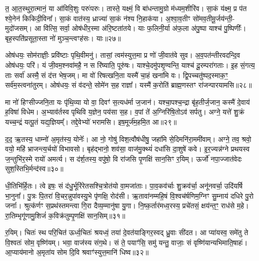 त॒ आ॒त॒स्थुरा॒त्मानं॒ या आ॑विवि॒शुः परुः॑परुः। तास्ते॒ यक्ष्मं॒ वि बा॑धन्तामु॒ग्रो म॑ध्यम॒शीरि॑व। सा॒कं य॑क्ष्म॒ प्र प॑त श्ये॒नेन॑ किकिदी॒विना᳚। सा॒कं वात॑स्य॒ ध्राज्या॑ सा॒कं न॑श्य नि॒हाक॑या। अ॒श्वा॒व॒तीꣳ सो॑मव॒तीमू॒र्जय॑न्ती॒- मुदो॑जसम्। आ वि॑त्सि॒ सर्वा॒ ओष॑धीर॒स्मा अ॑रि॒ष्टता॑तये। याः फ॒लिनी॒र्या अ॑फ॒ला अ॑पु॒ष्पा याश्च॑ पु॒ष्पिणीः᳚। बृह॒स्पति॑प्रसूता॒स्ता नो॑ मुञ्च॒न्त्वꣳह॑सः। याः॥२७॥

ओष॑धयः॒ सोम॑राज्ञीः॒ प्रवि॑ष्टाः पृथि॒वीमनु॑। तासां॒ त्वम॑स्युत्त॒मा प्र णो॑ जी॒वात॑वे सुव। अ॒व॒पत॑न्तीरवदन्दि॒व ओष॑धयः॒ परि॑। यं जी॒वम॒श्नवा॑महै॒ न स रि॑ष्याति॒ पूरु॑षः। याश्चे॒दमु॑पशृ॒ण्वन्ति॒ याश्च॑ दू॒रम्परा॑गताः। इ॒ह सं॒गत्य॒ ताः सर्वा॑ अस्मै॒ सं द॑त्त भेष॒जम्। मा वो॑ रिषत्खनि॒ता यस्मै॑ चा॒हं खना॑मि वः। द्वि॒पच्चतु॑ष्पद॒स्माक॒ꣳ॒ सर्व॑म॒स्त्वना॑तुरम्। ओष॑धयः॒ सं व॑दन्ते॒ सोमे॑न स॒ह राज्ञा᳚। यस्मै॑ क॒रोति॑ ब्राह्म॒णस्तꣳ रा॑जन्पारयामसि॥२८॥

{\anuvakamend[{रपः॑ पत॒त्रिणी॒र्या अꣳह॑सो॒ याः खना॑मि वो॒\-ऽष्टाद॑श च॥६॥}]}

मा नो॑ हिꣳसीज्जनि॒ता यः पृ॑थि॒व्या यो वा॒ दिवꣳ॑ स॒त्यध॑र्मा ज॒जान॑। यश्चा॒पश्च॒न्द्रा बृ॑ह॒तीर्ज॒जान॒ कस्मै॑ दे॒वाय॑ ह॒विषा॑ विधेम। अ॒भ्याव॑र्तस्व पृथिवि य॒ज्ञेन॒ पय॑सा स॒ह। व॒पां ते॑ अ॒ग्निरि॑षि॒तो\-ऽव॑ सर्पतु। अग्ने॒ यत्ते॑ शु॒क्रं यच्च॒न्द्रं यत्पू॒तं यद्य॒ज्ञियम्᳚। तद्दे॒वेभ्यो॑ भरामसि। इष॒मूर्ज॑म॒हमि॒त आ॥२९॥

द॒द॒ ऋ॒तस्य॒ धाम्नो॑ अ॒मृत॑स्य॒ योनेः᳚। आ नो॒ गोषु॑ विश॒त्वौष॑धीषु॒ जहा॑मि से॒दिमनि॑रा॒ममी॑वाम्। अग्ने॒ तव॒ श्रवो॒ वयो॒ महि॑ भ्राजन्त्य॒र्चयो॑ विभावसो। बृह॑द्भानो॒ शव॑सा॒ वाज॑मु॒क्थ्यं॑ दधा॑सि दा॒शुषे॑ कवे। इ॒र॒ज्यन्न॑ग्ने प्रथयस्व ज॒न्तुभि॑र॒स्मे रायो॑ अमर्त्य। स द॑र्\mbox{}श॒तस्य॒ वपु॑षो॒ वि रा॑जसि पृ॒णक्षि॑ सान॒सिꣳ र॒यिम्। ऊर्जो॑ नपा॒ज्जात॑वेदः सुश॒स्तिभि॒र्मन्द॑स्व॥३०॥

धी॒तिभि॑र्हि॒तः। त्वे इषः॒ सं द॑धु॒र्भूरि॑रेतसश्चि॒त्रोत॑यो वा॒मजा॑ताः। पा॒व॒कव॑र्चाः शु॒क्रव॑र्चा॒ अनू॑नवर्चा॒ उदि॑यर्\mbox{}षि भा॒नुना᳚। पु॒त्रः पि॒तरा॑ वि॒चर॒न्नुपा॑वस्यु॒भे पृ॑णक्षि॒ रोद॑सी। ऋ॒तावा॑नम्महि॒षं वि॒श्वच॑र्\mbox{}षणिम॒ग्निꣳ सु॒म्नाय॑ दधिरे पु॒रो जनाः᳚। श्रुत्क॑र्णꣳ स॒प्रथ॑स्तमन्त्वा गि॒रा दैव्य॒म्मानु॑षा यु॒गा। नि॒ष्क॒र्तार॑मध्व॒रस्य॒ प्रचे॑तसं॒ क्षय॑न्त॒ꣳ॒ राध॑से म॒हे। रा॒तिम्भृगू॑णामु॒शिजं॑ क॒विक्र॑तुम्पृ॒णक्षि॑ सान॒सिम्॥३१॥

र॒यिम्। चितः॑ स्थ परि॒चित॑ ऊर्ध्व॒चितः॑ श्रयध्वं॒ तया॑ दे॒वत॑याङ्गिर॒स्वद् ध्रु॒वाः सी॑दत। आ प्या॑यस्व॒ समे॑तु ते वि॒श्वतः॑ सोम॒ वृष्णि॑यम्। भवा॒ वाज॑स्य संग॒थे। सं ते॒ पयाꣳ॑सि॒ समु॑ यन्तु॒ वाजाः॒ सं वृष्णि॑यान्यभिमाति॒षाहः॑। आ॒प्याय॑मानो अ॒मृता॑य सोम दि॒वि श्रवाꣳ॑स्युत्त॒मानि॑ धिष्व॥३२॥

